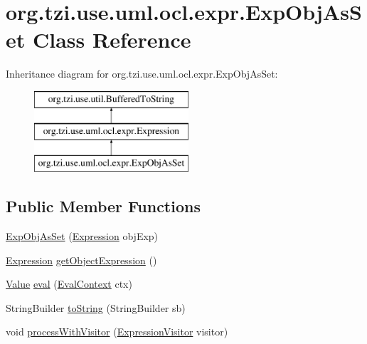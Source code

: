 \hypertarget{classorg_1_1tzi_1_1use_1_1uml_1_1ocl_1_1expr_1_1_exp_obj_as_set}{\section{org.\-tzi.\-use.\-uml.\-ocl.\-expr.\-Exp\-Obj\-As\-Set Class Reference}
\label{classorg_1_1tzi_1_1use_1_1uml_1_1ocl_1_1expr_1_1_exp_obj_as_set}
}
Inheritance diagram for org.\-tzi.\-use.\-uml.\-ocl.\-expr.\-Exp\-Obj\-As\-Set\-:\begin{figure}[H]
\begin{center}
\leavevmode
\includegraphics[height=3.000000cm]{classorg_1_1tzi_1_1use_1_1uml_1_1ocl_1_1expr_1_1_exp_obj_as_set}
\end{center}
\end{figure}
\subsection*{Public Member Functions}
\begin{DoxyCompactItemize}
\item 
\hyperlink{classorg_1_1tzi_1_1use_1_1uml_1_1ocl_1_1expr_1_1_exp_obj_as_set_a6787cfca13bce07b201bfb2e031ca8dc}{Exp\-Obj\-As\-Set} (\hyperlink{classorg_1_1tzi_1_1use_1_1uml_1_1ocl_1_1expr_1_1_expression}{Expression} obj\-Exp)
\item 
\hyperlink{classorg_1_1tzi_1_1use_1_1uml_1_1ocl_1_1expr_1_1_expression}{Expression} \hyperlink{classorg_1_1tzi_1_1use_1_1uml_1_1ocl_1_1expr_1_1_exp_obj_as_set_aa4ab8936e7d77204a9d0e6158e599b49}{get\-Object\-Expression} ()
\item 
\hyperlink{classorg_1_1tzi_1_1use_1_1uml_1_1ocl_1_1value_1_1_value}{Value} \hyperlink{classorg_1_1tzi_1_1use_1_1uml_1_1ocl_1_1expr_1_1_exp_obj_as_set_a274d74d24edd48503fb749646898ce5c}{eval} (\hyperlink{classorg_1_1tzi_1_1use_1_1uml_1_1ocl_1_1expr_1_1_eval_context}{Eval\-Context} ctx)
\item 
String\-Builder \hyperlink{classorg_1_1tzi_1_1use_1_1uml_1_1ocl_1_1expr_1_1_exp_obj_as_set_ae86d1bf92c8c9bc3ad4f7f95273469f3}{to\-String} (String\-Builder sb)
\item 
void \hyperlink{classorg_1_1tzi_1_1use_1_1uml_1_1ocl_1_1expr_1_1_exp_obj_as_set_ae0ef3b2918cd55f5b1a720dcad04db85}{process\-With\-Visitor} (\hyperlink{interfaceorg_1_1tzi_1_1use_1_1uml_1_1ocl_1_1expr_1_1_expression_visitor}{Expression\-Visitor} visitor)
\end{DoxyCompactItemize}
